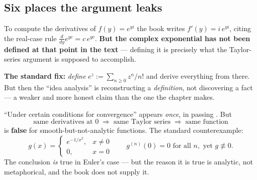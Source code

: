 \subsection{Six places the argument leaks}

\begin{critbox}[title={\textsf{LEAK 1} \; A circularity in the Taylor-series demonstration \normalfont\itshape(book p.~446 / pdf p.~465)}]
To compute the derivatives of $f(y)=e^{yi}$ the book writes $f'(y)=i\,e^{yi}$, citing the real-case
rule $\frac{d}{dy}e^{yc}=c\,e^{yc}$. \textbf{But the complex exponential has not been defined at that
point in the text} --- defining it is precisely what the Taylor-series argument is supposed to
accomplish.
\begin{center}
\end{center}
\textbf{The standard fix:} \emph{define} $e^{z}:=\sum_{n\ge0}z^{n}/n!$ and derive everything from
there. But then the ``idea analysis'' is reconstructing a \emph{definition}, not discovering a fact
--- a weaker and more honest claim than the one the chapter makes.
\end{critbox}

\begin{critbox}[title={\textsf{LEAK 2} \; Analyticity is waved through}]
``Under certain conditions for convergence'' appears \emph{once}, in passing . But
\[\text{same derivatives at }0\;\Longrightarrow\;\text{same Taylor series}\;\Longrightarrow\;\text{same function}\]
is \textbf{false} for smooth-but-not-analytic functions. The standard counterexample:
\[
g(x)=\begin{cases} e^{-1/x^{2}}, & x\neq0\\ 0,& x=0\end{cases}
\qquad g^{(n)}(0)=0 \text{ for all } n, \text{ yet } g\not\equiv0 .
\]
The conclusion \emph{is} true in Euler's case --- but the reason it is true is analytic, not
metaphorical, and the book does not supply it.
\end{critbox}

